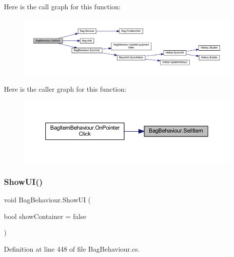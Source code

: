 Here is the call graph for this function\+:
\nopagebreak
\begin{figure}[H]
\begin{center}
\leavevmode
\includegraphics[width=350pt]{class_bag_behaviour_aa0aed3d648b13c1add4c2e2ce2ac9c38_cgraph}
\end{center}
\end{figure}
Here is the caller graph for this function\+:
\nopagebreak
\begin{figure}[H]
\begin{center}
\leavevmode
\includegraphics[width=350pt]{class_bag_behaviour_aa0aed3d648b13c1add4c2e2ce2ac9c38_icgraph}
\end{center}
\end{figure}
\mbox{\label{class_bag_behaviour_aed83310e460fbfb0fa033cfd9fa41ba5}} 
\subsubsection{\texorpdfstring{ShowUI()}{ShowUI()}}
{\footnotesize\ttfamily void Bag\+Behaviour.\+Show\+UI (\begin{DoxyParamCaption}\item[{bool}]{show\+Container = {\ttfamily false} }\end{DoxyParamCaption})}



Definition at line 448 of file Bag\+Behaviour.\+cs.

